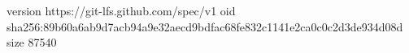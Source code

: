 version https://git-lfs.github.com/spec/v1
oid sha256:89b60a6ab9d7acb94a9e32aecd9bdfac68fe832c1141e2ca0c0c2d3de934d08d
size 87540
